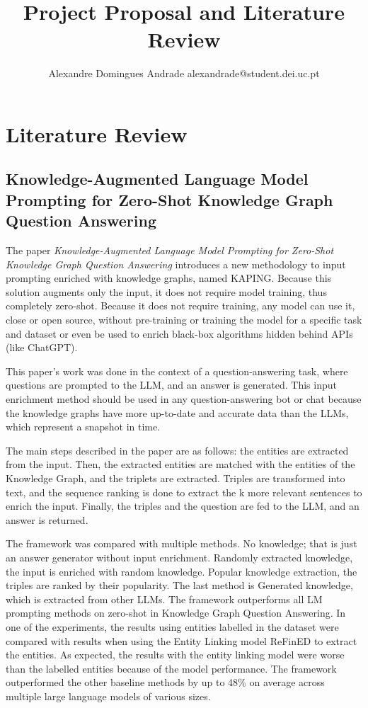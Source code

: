 \documentclass{article}
\title{Project Proposal and Literature Review}
\author{
    Alexandre Domingues Andrade
    \emails
    alexandrade@student.dei.uc.pt
}
\begin{document}
\maketitle

\section{Literature Review}

\subsection{Knowledge-Augmented Language Model Prompting
for Zero-Shot Knowledge Graph Question Answering}

The paper \textit{Knowledge-Augmented Language Model Prompting
for Zero-Shot Knowledge Graph Question Answering}\cite{baek2023knowledgeaugmentedlanguagemodelprompting} introduces a new methodology to input prompting enriched with knowledge graphs, named KAPING. Because this solution augments only the input, it does not require model training, thus completely zero-shot. Because it does not require training, any model can use it, close or open source, without pre-training or training the model for a specific task and dataset or even be used to enrich black-box algorithms hidden behind APIs (like ChatGPT).

This paper's work was done in the context of a question-answering task, where questions are prompted to the LLM, and an answer is generated. This input enrichment method should be used in any question-answering bot or chat because the knowledge graphs have more up-to-date and accurate data than the LLMs, which represent a snapshot in time.

The main steps described in the paper are as follows: the entities are extracted from the input. Then, the extracted entities are matched with the entities of the Knowledge Graph, and the triplets are extracted. Triples are transformed into text, and the sequence ranking is done to extract the k more relevant sentences to enrich the input. Finally, the triples and the question are fed to the LLM, and an answer is returned.

The framework was compared with multiple methods. No knowledge; that is just an answer generator without input enrichment. Randomly extracted knowledge, the input is enriched with random knowledge. Popular knowledge extraction, the triples are ranked by their popularity. The last method is Generated knowledge, which is extracted from other LLMs. The framework outperforms all LM prompting methods on zero-shot in Knowledge Graph Question Answering. In one of the experiments, the results using entities labelled in the dataset were compared with results when using the Entity Linking model ReFinED to extract the entities. As expected, the results with the entity linking model were worse than the labelled entities because of the model performance. The framework outperformed the other baseline methods by up to 48\% on average across multiple large language models of various sizes.
\end{document}
